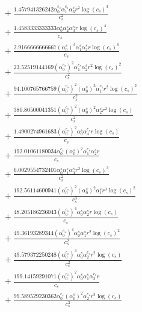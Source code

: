 \documentclass[10pt]{article}
\begin{document}
\begin{align*}
&{}  + \frac{1.457941326242 \alpha_{0}^{c_s} \alpha_{1}^{c_s} \alpha_{3}^s r^{2} \log{\left(c_{s} \right)}^{3}}{c_{s}^{2}} \\
&{}  + \frac{1.4583333333333 \alpha_{0}^s \alpha_{2}^s \alpha_{3}^s r \log{\left(c_{s} \right)}^{4}}{c_{s}} \\
&{}  + \frac{2.9166666666667 \left(\alpha_{0}^s\right)^{3} \alpha_{1}^s \alpha_{2}^s r \log{\left(c_{s} \right)}^{4}}{c_{s}} \\
&{}  + \frac{23.52519144169 \left(\alpha_{0}^{c_s}\right)^{2} \alpha_{1}^{c_s} \alpha_{2}^s r^{2} \log{\left(c_{s} \right)}^{2}}{c_{s}^{2}} \\
&{}  + \frac{94.100765766759 \left(\alpha_{0}^{c_s}\right)^{2} \left(\alpha_{0}^s\right)^{3} \alpha_{1}^{c_s} r^{2} \log{\left(c_{s} \right)}^{2}}{c_{s}^{2}} \\
&{}  + \frac{380.80500041351 \left(\alpha_{0}^{c_s}\right)^{2} \left(\alpha_{0}^s\right)^{2} \alpha_{2}^s r^{2} \log{\left(c_{s} \right)}}{c_{s}^{2}} \\
&{}  + \frac{1.4900274961683 \left(\alpha_{0}^{c_s}\right)^{2} \alpha_{0}^s \alpha_{4}^{c_s} r \log{\left(c_{s} \right)}}{c_{s}} \\
&{}  + \frac{192.01061180034 \alpha_{0}^{c_s} \left(\alpha_{0}^s\right)^{2} \alpha_{1}^{c_s} \alpha_{2}^s r}{c_{s}} \\
&{}  + \frac{6.0029554732401 \alpha_{0}^s \alpha_{1}^s \alpha_{3}^s r^{2} \log{\left(c_{s} \right)}^{3}}{c_{s}^{2}} \\
&{}  + \frac{192.56114600941 \left(\alpha_{0}^{c_s}\right)^{2} \left(\alpha_{0}^s\right)^{2} \alpha_{1}^s r^{3} \log{\left(c_{s} \right)}^{2}}{c_{s}^{3}} \\
&{}  + \frac{48.205186236043 \left(\alpha_{0}^{c_s}\right)^{4} \alpha_{0}^s \alpha_{2}^s r \log{\left(c_{s} \right)}}{c_{s}} \\
&{}  + \frac{49.36193289344 \left(\alpha_{0}^{c_s}\right)^{4} \alpha_{0}^s \alpha_{1}^s r^{2} \log{\left(c_{s} \right)}^{2}}{c_{s}^{2}} \\
&{}  + \frac{49.579372250248 \left(\alpha_{0}^{c_s}\right)^{3} \alpha_{0}^s \alpha_{2}^{c_s} r^{2} \log{\left(c_{s} \right)}}{c_{s}^{2}} \\
&{}  + \frac{199.14159291071 \left(\alpha_{0}^{c_s}\right)^{2} \alpha_{0}^s \alpha_{1}^s \alpha_{2}^{c_s} r}{c_{s}} \\
&{}  + \frac{99.589529230362 \alpha_{0}^{c_s} \left(\alpha_{0}^s\right)^{2} \alpha_{2}^{c_s} r^{3} \log{\left(c_{s} \right)}}{c_{s}^{3}} \\

\end{align*}
\end{document}
